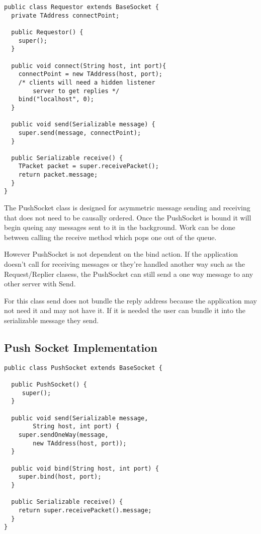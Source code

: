\documentclass[10pt,journal,compsoc]{IEEEtran}
\begin{document}
\begin{lstlisting}
public class Requestor extends BaseSocket {
  private TAddress connectPoint;

  public Requestor() {
    super();
  }

  public void connect(String host, int port){
    connectPoint = new TAddress(host, port);
    /* clients will need a hidden listener
        server to get replies */
    bind("localhost", 0);
  }

  public void send(Serializable message) {
    super.send(message, connectPoint);
  }

  public Serializable receive() {
    TPacket packet = super.receivePacket();
    return packet.message;
  }
}

\end{lstlisting}

The PushSocket class is designed for asymmetric message sending and receiving that does not need to be causally ordered. Once the PushSocket is bound it will begin queing any messages sent to it in the background. Work can be done between calling the receive method which pops one out of the queue. 

However PushSocket is not dependent on the bind action. If the application doesn't call for receiving messages or they're handled another way such as the Request/Replier clasess, the PushSocket can still send a one way message to any other server with Send.

For this class send does not bundle the reply address because the application may not need it and may not have it. If it is needed the user can bundle it into the serializable message they send.

\subsection{Push Socket Implementation}
\begin{lstlisting}
public class PushSocket extends BaseSocket {

  public PushSocket() {
     super();
  }

  public void send(Serializable message,
        String host, int port) {
    super.sendOneWay(message,
        new TAddress(host, port));
  }

  public void bind(String host, int port) {
    super.bind(host, port);
  }

  public Serializable receive() {
    return super.receivePacket().message;
  }
}

\end{lstlisting}
\end{document}
